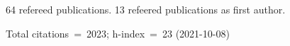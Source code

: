 64 refereed publications. 13 refeered publications as first author.

Total citations~=~2023; h-index~=~23 (2021-10-08)